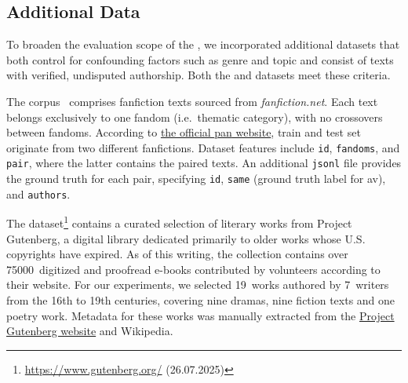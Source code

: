 \subsection{Additional Data}
\label{subsec:additional_data}
To broaden the evaluation scope of the \impAppr{}, we incorporated additional datasets that both control for confounding factors such as genre and topic and consist of texts with verified, undisputed authorship. 
Both the \dataPan{} and \dataGutenberg{} datasets meet these criteria.

The \dataPan{} corpus~\citep{bischoff_importance_2020} comprises fanfiction texts sourced from \textit{fanfiction.net}.
Each text belongs exclusively to one fandom (i.e.\ thematic category), with no crossovers between fandoms.
According to \href{https://pan.webis.de/clef20/pan20-web/author-identification.html}{the official \acs{pan} website}, 
train and test set originate from two different fanfictions.
Dataset features include \texttt{id}, \texttt{fandoms}, and \texttt{pair}, where the latter contains the paired texts.
An additional \texttt{jsonl} file provides the ground truth for each pair, specifying \texttt{id}, \texttt{same} (ground truth label for \ac{av}), and \texttt{authors}.

The \dataGutenberg{} dataset\footnote{\url{https://www.gutenberg.org/} (26.07.2025)} contains a curated selection of literary works from Project Gutenberg, a digital library dedicated primarily to older works whose U.S. copyrights have expired.
As of this writing, the collection contains over \num{75000}~digitized and proofread e-books contributed by volunteers according to their website.
For our experiments, we selected 19~works authored by 7~writers from the 16th to 19th centuries, covering nine dramas, nine fiction texts and one poetry work.
Metadata for these works was manually extracted from the \href{https://www.gutenberg.org/}{Project Gutenberg website} and Wikipedia.


